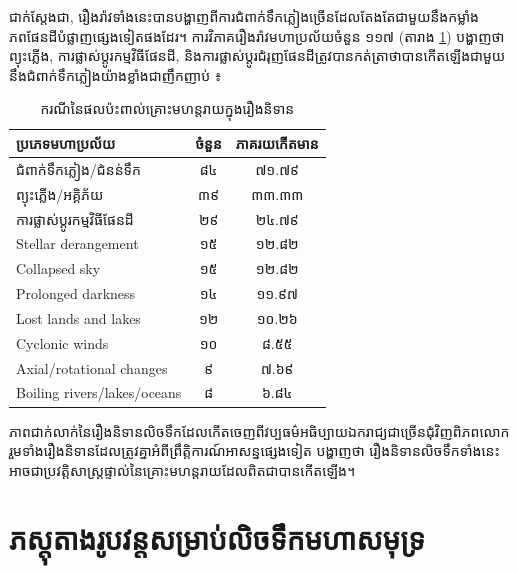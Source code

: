 \documentclass[10pt,twocolumn,letterpaper]{article}
\begin{document}
ជាក់ស្តែងជា, រឿងរ៉ាវទាំងនេះបានបង្ហាញពីការជំពាក់ទឹកភ្លៀងច្រើនដែលតែងតែជាមួយនឹងកម្លាំងភពផែនដីបំផ្លាញផ្សេងទៀតផងដែរ។ ការវិភាគរឿងរ៉ាវមហាប្រល័យចំនួន ១១៧ (តារាង \ref{tab: 1}) បង្ហាញថា ព្យុះភ្លើង, ការផ្លាស់ប្ដូរកម្មវិធីផែនដី, និងការផ្លាស់ប្ដូរជំរុញផែនដីត្រូវបានកត់ត្រាថាបានកើតឡើងជាមួយនឹងជំពាក់ទឹកភ្លៀងយ៉ាងខ្លាំងជាញឹកញាប់ \cite{14}៖

\begin{table}[ht]
\begin{center}
\renewcommand{\arraystretch}{1.2}  %
\begin{tabular}{|l|c|c|}
\hline
\textbf{ប្រភេទមហាប្រល័យ} & \textbf{ចំនួន} & \textbf{ភាគរយកើតមាន} \\
\hline\hline
ជំពាក់ទឹកភ្លៀង/ជំនន់ទឹក            & ៨៤ & ៧១.៧៩ \\
ព្យុះភ្លើង/អគ្គិភ័យ   & ៣៩ & ៣៣.៣៣ \\
ការផ្លាស់ប្ដូរកម្មវិធីផែនដី   & ២៩ & ២៤.៧៩ \\

Stellar derangement     & ១៥ & ១២.៨២ \\
Collapsed sky           & ១៥ & ១២.៨២ \\
Prolonged darkness      & ១៤ & ១១.៩៧ \\
Lost lands and lakes    & ១២ & ១០.២៦ \\
Cyclonic winds          & ១០ & ៨.៥៥  \\
Axial/rotational changes & ៩ & ៧.៦៩  \\
Boiling rivers/lakes/oceans & ៨ & ៦.៨៤ \\
\hline
\end{tabular}
\end{center}
\caption{ករណីនៃផលប៉ះពាល់គ្រោះមហន្តរាយក្នុងរឿងនិទាន}
\label{tab: 1}
\end{table}

ភាពជាក់លាក់នៃរឿងនិទានលិចទឹកដែលកើតចេញពីវប្បធម៌អធិប្បាយឯករាជ្យជាច្រើនជុំវិញពិភពលោក រួមទាំងរឿងនិទានដែលត្រូវគ្នាអំពីព្រឹត្តិការណ៍អាសន្នផ្សេងទៀត បង្ហាញថា រឿងនិទានលិចទឹកទាំងនេះអាចជាប្រវត្តិសាស្រ្តផ្ទាល់នៃគ្រោះមហន្តរាយដែលពិតជាបានកើតឡើង។

\section{ភស្តុតាងរូបវន្តសម្រាប់លិចទឹកមហាសមុទ្រ}
\end{document}
